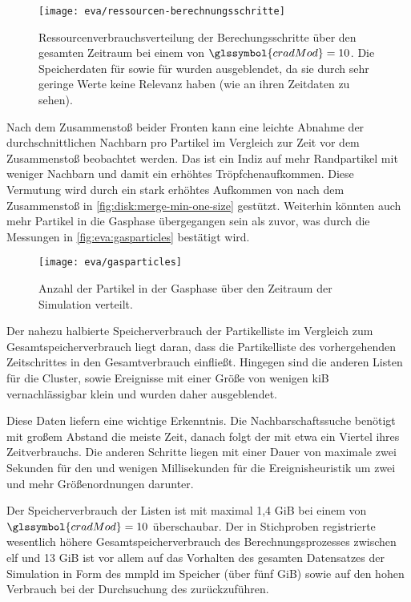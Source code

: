 \begin{figure}
	\texttt{[image: eva/ressourcen-berechnungsschritte]}
	\caption{Ressourcenverbrauchsverteilung der Berechungsschritte über den gesamten Zeitraum bei einem  von $\glssymbol{cradMod} = 10$. Die Speicherdaten für \SECC sowie für \DSE wurden ausgeblendet, da sie durch sehr geringe Werte keine Relevanz haben (wie an ihren Zeitdaten zu sehen).}\label{fig:eva:ressourcen-berechnungsschritte}
\end{figure}

Nach dem Zusammenstoß beider Fronten kann eine leichte Abnahme der durchschnittlichen Nachbarn pro Partikel im Vergleich zur Zeit vor dem Zusammenstoß beobachtet werden. Das ist ein Indiz auf mehr Randpartikel mit weniger Nachbarn und damit ein erhöhtes Tröpfchenaufkommen. Diese Vermutung wird durch ein stark erhöhtes Aufkommen von  nach dem Zusammenstoß in \autoref{fig:disk:merge-min-one-size} gestützt. Weiterhin könnten auch mehr Partikel in die Gasphase übergegangen sein als zuvor, was durch die Messungen in \autoref{fig:eva:gasparticles} bestätigt wird.

\begin{figure}
	\texttt{[image: eva/gasparticles]}
	\caption{Anzahl der Partikel in der Gasphase über den Zeitraum der Simulation verteilt.}\label{fig:eva:gasparticles}
\end{figure}

Der nahezu halbierte Speicherverbrauch der Partikelliste im Vergleich zum Gesamtspeicherverbrauch liegt daran, dass die Partikelliste des vorhergehenden Zeitschrittes in den Gesamtverbrauch einfließt. Hingegen sind die anderen Listen für die Cluster,  sowie Ereignisse mit einer Größe von wenigen \gls{kiB} vernachlässigbar klein und wurden daher ausgeblendet.

Diese Daten liefern eine wichtige Erkenntnis. Die Nachbarschaftssuche benötigt mit großem Abstand die meiste Zeit, danach folgt der \CFD mit etwa ein Viertel ihres Zeitverbrauchs. Die anderen Schritte liegen mit einer Dauer von maximale zwei Sekunden für den \SECC und wenigen Millisekunden für die Ereignisheuristik um zwei und mehr Größenordnungen darunter.

Der Speicherverbrauch der Listen ist mit maximal 1,4 \gls{GiB} bei einem  von $\glssymbol{cradMod} = 10$ überschaubar. Der in Stichproben registrierte wesentlich höhere Gesamtspeicherverbrauch des Berechnungsprozesses zwischen elf und 13 \gls{GiB} ist vor allem auf das Vorhalten des gesamten Datensatzes der Simulation in Form des \gls{mmpld} im Speicher (über fünf \gls{GiB}) sowie auf den hohen Verbrauch bei der Durchsuchung des  zurückzuführen.


